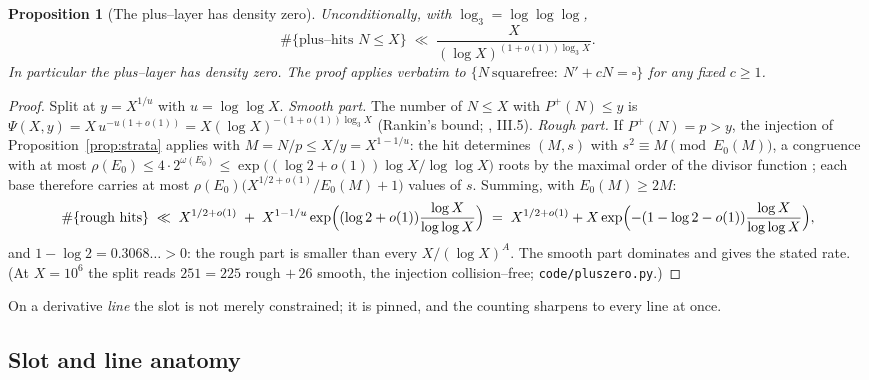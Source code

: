 \documentclass[11pt]{article}
\newtheorem{proposition}[theorem]{Proposition}
\theoremstyle{definition}
\begin{document}
\begin{proposition}[The plus--layer has density zero]\label{prop:pluszero}
Unconditionally, with $\log_3=\log\log\log$,
\[ \#\{\text{plus--hits }N\le X\}\;\ll\;\frac{X}{(\log X)^{(1+o(1))\log_3X}}. \]
In particular the plus--layer has density zero. The proof applies verbatim to
$\{N\ \text{squarefree}:\ N'+cN=\square\}$ for any fixed $c\ge1$.
\end{proposition}
\begin{proof}
Split at $y=X^{1/u}$ with $u=\log\log X$. \emph{Smooth part.} The number of $N\le X$ with
$P^+(N)\le y$ is $\Psi(X,y)=X\,u^{-u(1+o(1))}=X(\log X)^{-(1+o(1))\log_3X}$ (Rankin's bound;
\cite{Tenenbaum}, III.5). \emph{Rough part.} If $P^+(N)=p>y$, the injection of
Proposition~\ref{prop:strata} applies with $M=N/p\le X/y=X^{1-1/u}$: the hit determines $(M,s)$
with $s^2\equiv M\pmod{E_0(M)}$, a congruence with at most
$\rho(E_0)\le4\cdot2^{\omega(E_0)}\le\exp\bigl((\log2+o(1))\log X/\log\log X\bigr)$ roots by the
maximal order of the divisor function \cite{HardyWright}; each base therefore carries at most
$\rho(E_0)\bigl(X^{1/2+o(1)}/E_0(M)+1\bigr)$ values of $s$. Summing, with $E_0(M)\ge2M$:
\[ \#\{\text{rough hits}\}\;\ll\;X^{1/2+o(1)}\;+\;X^{1-1/u}
\exp\Bigl((\log2+o(1))\frac{\log X}{\log\log X}\Bigr)
\;=\;X^{1/2+o(1)}+X\exp\Bigl(-(1-\log2-o(1))\frac{\log X}{\log\log X}\Bigr), \]
and $1-\log2=0.3068\ldots>0$: the rough part is smaller than every $X/(\log X)^A$. The smooth part
dominates and gives the stated rate. (At $X=10^6$ the split reads $251=225$ rough $+\,26$ smooth,
the injection collision--free; \texttt{code/pluszero.py}.)
\end{proof}

On a derivative \emph{line} the slot is not merely constrained; it is pinned, and the counting
sharpens to every line at once.

\subsection{Slot and line anatomy}\label{ssec:slotanatomy}
\end{document}
